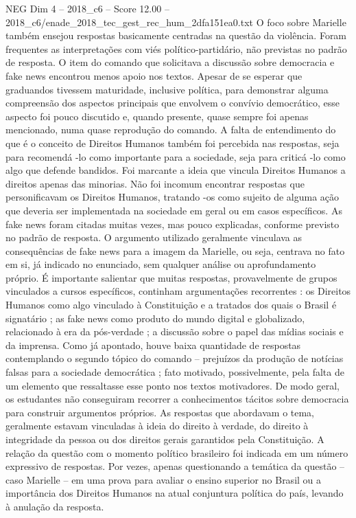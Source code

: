 \begin{textsample}{NEG Dim 4 – 2018\_c6 – Score 12.00 – 2018\_c6/enade\_2018\_tec\_gest\_rec\_hum\_2dfa151ea0.txt}
O foco sobre Marielle também ensejou respostas basicamente centradas na questão da violência.
Foram frequentes as interpretações com viés político-partidário, não previstas no padrão de resposta.
O item do comando que solicitava a discussão sobre democracia e fake news encontrou menos apoio nos textos.
Apesar de se esperar que graduandos tivessem maturidade, inclusive política, para demonstrar alguma compreensão dos aspectos principais que envolvem o convívio democrático, esse aspecto foi pouco discutido e, quando presente, quase sempre foi apenas mencionado, numa quase reprodução do comando.
A falta de entendimento do que é o conceito de Direitos Humanos também foi percebida nas respostas, seja para recomendá -lo como importante para a sociedade, seja para criticá -lo como algo que defende bandidos.
Foi marcante a ideia que vincula Direitos Humanos a direitos apenas das minorias.
Não foi incomum encontrar respostas que personificavam os Direitos Humanos, tratando -os como sujeito de alguma ação que deveria ser implementada na sociedade em geral ou em casos específicos.
As fake news foram citadas muitas vezes, mas pouco explicadas, conforme previsto no padrão de resposta.
O argumento utilizado geralmente vinculava as consequências de fake news para a imagem da Marielle, ou seja, centrava no fato em si, já indicado no enunciado, sem qualquer análise ou aprofundamento próprio.
É importante salientar que muitas respostas, provavelmente de grupos vinculados a cursos específicos, continham argumentações recorrentes : os Direitos Humanos como algo vinculado à Constituição e a tratados dos quais o Brasil é signatário ; as fake news como produto do mundo digital e globalizado, relacionado à era da pós-verdade ; a discussão sobre o papel das mídias sociais e da imprensa.
Como já apontado, houve baixa quantidade de respostas contemplando o segundo tópico do comando – prejuízos da produção de notícias falsas para a sociedade democrática ; fato motivado, possivelmente, pela falta de um elemento que ressaltasse esse ponto nos textos motivadores.
De modo geral, os estudantes não conseguiram recorrer a conhecimentos tácitos sobre democracia para construir argumentos próprios.
As respostas que abordavam o tema, geralmente estavam vinculadas à ideia do direito à verdade, do direito à integridade da pessoa ou dos direitos gerais garantidos pela Constituição.
A relação da questão com o momento político brasileiro foi indicada em um número expressivo de respostas.
Por vezes, apenas questionando a temática da questão – caso Marielle – em uma prova para avaliar o ensino superior no Brasil ou a importância dos Direitos Humanos na atual conjuntura política do país, levando à anulação da resposta.

\end{textsample}
